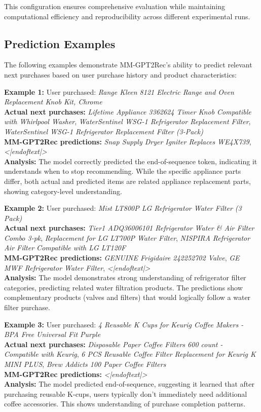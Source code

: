 \documentclass[conference]{IEEEtran}
\begin{document}
This configuration ensures comprehensive evaluation while maintaining computational efficiency and reproducibility across different experimental runs.

\subsection*{Prediction Examples}

The following examples demonstrate MM-GPT2Rec's ability to predict relevant next purchases based on user purchase history and product characteristics:

\textbf{Example 1:} User purchased: \textit{Range Kleen 8121 Electric Range and Oven Replacement Knob Kit, Chrome} \\
\textbf{Actual next purchases:} \textit{Lifetime Appliance 3362624 Timer Knob Compatible with Whirlpool Washer}, \textit{WaterSentinel WSG-1 Refrigerator Replacement Filter}, \textit{WaterSentinel WSG-1 Refrigerator Replacement Filter (3-Pack)} \\
\textbf{MM-GPT2Rec predictions:} \textit{Snap Supply Dryer Igniter Replaces WE4X739}, \textit{<|endoftext|>} \\
\textbf{Analysis:} The model correctly predicted the end-of-sequence token, indicating it understands when to stop recommending. While the specific appliance parts differ, both actual and predicted items are related appliance replacement parts, showing category-level understanding.

\textbf{Example 2:} User purchased: \textit{Mist LT800P LG Refrigerator Water Filter (3 Pack)} \\
\textbf{Actual next purchases:} \textit{Tier1 ADQ36006101 Refrigerator Water \& Air Filter Combo 3-pk}, \textit{Replacement for LG LT700P Water Filter}, \textit{NISPIRA Refrigerator Air Filter Compatible with LG LT120F} \\
\textbf{MM-GPT2Rec predictions:} \textit{GENUINE Frigidaire 242252702 Valve}, \textit{GE MWF Refrigerator Water Filter}, \textit{<|endoftext|>} \\
\textbf{Analysis:} The model demonstrates strong understanding of refrigerator filter categories, predicting related water filtration products. The predictions show complementary products (valves and filters) that would logically follow a water filter purchase.

\textbf{Example 3:} User purchased: \textit{4 Reusable K Cups for Keurig Coffee Makers - BPA Free Universal Fit Purple} \\
\textbf{Actual next purchases:} \textit{Disposable Paper Coffee Filters 600 count - Compatible with Keurig}, \textit{6 PCS Reusable Coffee Filter Replacement for Keurig K MINI PLUS}, \textit{Brew Addicts 100 Paper Coffee Filters} \\
\textbf{MM-GPT2Rec predictions:} \textit{<|endoftext|>} \\
\textbf{Analysis:} The model predicted end-of-sequence, suggesting it learned that after purchasing reusable K-cups, users typically don't immediately need additional coffee accessories. This shows understanding of purchase completion patterns.
\end{document}
